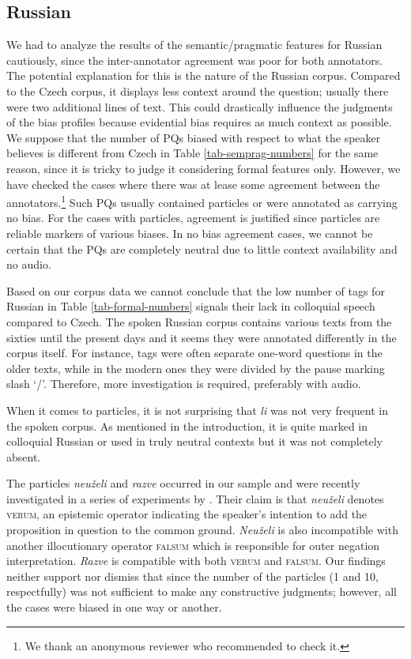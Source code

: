 \documentclass[output=paper,colorlinks,citecolor=brown]{langscibook}
\begin{document}
\subsection{Russian}
We had to analyze the results of the semantic/pragmatic features for Russian cautiously, since the inter-annotator agreement was poor for both annotators. The potential explanation for this is the nature of the Russian corpus. Compared to the Czech corpus, it displays less context around the question; usually there were two additional lines of text. This could drastically influence the judgments of the bias profiles because evidential bias requires as much context as possible. We suppose that the number of PQs biased with respect to what the speaker believes is different from Czech in Table \ref{tab-semprag-numbers} for the same reason, since it is tricky to judge it considering formal features only. However, we have checked the cases where there was at lease some agreement between the annotators.\footnote{We thank an anonymous reviewer who recommended to check it.} Such PQs usually contained particles or were annotated as carrying no bias. For the cases with particles, agreement is justified since particles are reliable markers of various biases. In no bias agreement cases, we cannot be certain that the PQs are completely neutral due to little context availability and no audio.

Based on our corpus data we cannot conclude that the low number of tags for Russian in Table \ref{tab-formal-numbers} signals their lack in colloquial speech compared to Czech. The spoken Russian corpus contains various texts from the sixties until the present days \citep{Grisina2009} and it seems they were annotated differently in the corpus itself. For instance, tags were often separate one-word questions in the older texts, while in the modern ones they were divided by the pause marking slash `/'. Therefore, more investigation is required, preferably with audio. 

When it comes to particles, it is not surprising that \textit{li} was not very frequent in the spoken corpus. As mentioned in the introduction, it is quite marked in colloquial Russian or used in truly neutral contexts but it was not completely absent. 

The particles \textit{neuželi} and \textit{razve} occurred in our sample and were recently investigated in a series of experiments by \citet{Geist2023}. Their claim is that \textit{neuželi} denotes \textsc{verum}, an epistemic operator indicating the speaker's intention to add the proposition in question to the common ground. \textit{Neuželi} is also incompatible with another illocutionary operator \textsc{falsum} which is responsible for outer negation interpretation. \textit{Razve} is compatible with both \textsc{verum} and \textsc{falsum}. Our findings neither support nor dismiss that since the number of the particles (1 and 10, respectfully) was not sufficient to make any constructive judgments; however, all the cases were biased in one way or another. 
\end{document}
